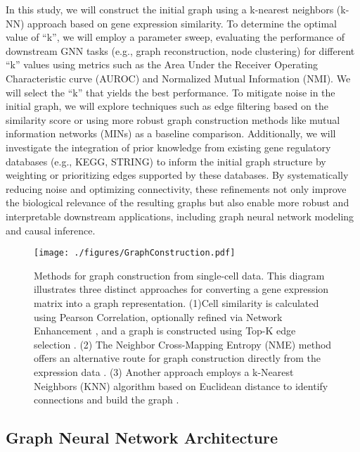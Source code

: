 In this study, we will construct the initial graph using a k-nearest neighbors (k-NN) approach based on gene expression similarity. To determine the optimal value of ``k'', we will employ a parameter sweep, evaluating the performance of downstream GNN tasks (e.g., graph reconstruction, node clustering) for different ``k'' values using metrics such as the Area Under the Receiver Operating Characteristic curve (AUROC) and Normalized Mutual Information (NMI). We will select the ``k'' that yields the best performance. To mitigate noise in the initial graph, we will explore techniques such as edge filtering based on the similarity score or using more robust graph construction methods like mutual information networks (MINs) as a baseline comparison. Additionally, we will investigate the integration of prior knowledge from existing gene regulatory databases (e.g., KEGG, STRING) to inform the initial graph structure by weighting or prioritizing edges supported by these databases. By systematically reducing noise and optimizing connectivity, these refinements not only improve the biological relevance of the resulting graphs but also enable more robust and interpretable downstream applications, including graph neural network modeling and causal inference.

\begin{figure}[htbp]
    \centering
    \texttt{[image: ./figures/GraphConstruction.pdf]}
    \caption{
        Methods for graph construction from single-cell data. This diagram illustrates three distinct approaches for converting a gene expression matrix into a graph representation. (1)Cell similarity is calculated using Pearson Correlation, optionally refined via Network Enhancement \cite{wang2018network}, and a graph is constructed using Top-K edge selection \cite{cheng2022scgac}. (2) The Neighbor Cross-Mapping Entropy (NME) method offers an alternative route for graph construction directly from the expression data \cite{li2023single}. (3) Another approach employs a k-Nearest Neighbors (KNN) algorithm based on Euclidean distance to identify connections and build the graph \cite{fan2024scgraphformer}.
    }
    \label{fig:graphconstruction}
\end{figure}

\subsection{Graph Neural Network Architecture}

